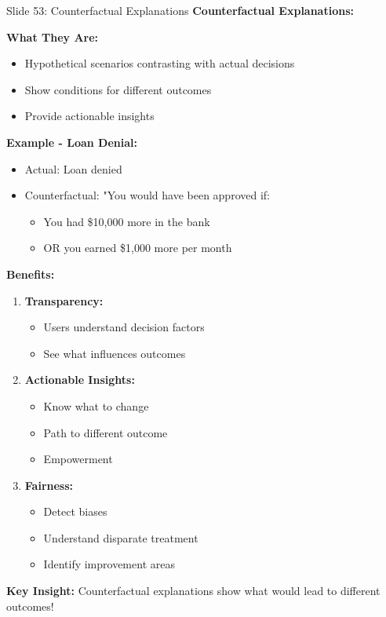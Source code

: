 \documentclass[8pt]{beamer}
\begin{document}
	\begin{frame}{Slide 53: Counterfactual Explanations}
		\fontsize{6.5}{7.5}\selectfont
		\textbf{Counterfactual Explanations:}
		
		\vspace{0.1cm}
		\textbf{What They Are:}
		\begin{itemize}
			\item Hypothetical scenarios contrasting with actual decisions
			\item Show conditions for different outcomes
			\item Provide actionable insights
		\end{itemize}
		
		\vspace{0.1cm}
		\textbf{Example - Loan Denial:}
		\begin{itemize}
			\item Actual: Loan denied
			\item Counterfactual: "You would have been approved if:
			\begin{itemize}
				\item You had \$10,000 more in the bank
				\item OR you earned \$1,000 more per month
			\end{itemize}
		\end{itemize}
		
		\vspace{0.1cm}
		\textbf{Benefits:}
		\begin{enumerate}
			\item \textbf{Transparency:}
			\begin{itemize}
				\item Users understand decision factors
				\item See what influences outcomes
			\end{itemize}
			\item \textbf{Actionable Insights:}
			\begin{itemize}
				\item Know what to change
				\item Path to different outcome
				\item Empowerment
			\end{itemize}
			\item \textbf{Fairness:}
			\begin{itemize}
				\item Detect biases
				\item Understand disparate treatment
				\item Identify improvement areas
			\end{itemize}
		\end{enumerate}
		
		\textcolor{myblue}{\textbf{Key Insight:}} Counterfactual explanations show \textcolor{myblue}{what would lead to different outcomes}!
	\end{frame}
	
\end{document}
